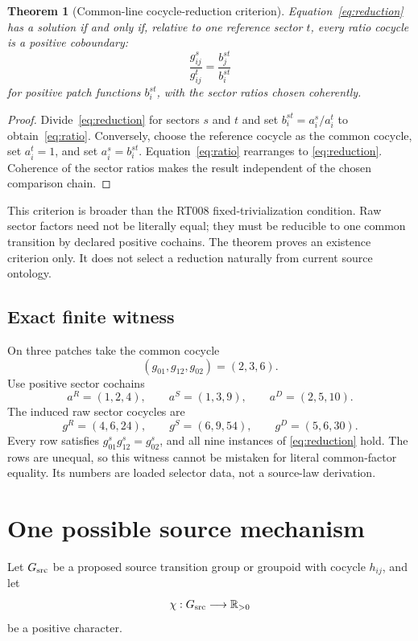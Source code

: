 \documentclass[11pt]{article}
\newtheorem{theorem}{Theorem}
\newcommand{\RR}{\mathbb R}
\begin{document}
\begin{theorem}[Common-line cocycle-reduction criterion]
Equation~\eqref{eq:reduction} has a solution if and only if, relative to one
reference sector $t$, every ratio cocycle is a positive coboundary:
\begin{equation}\label{eq:ratio}
 \frac{g^s_{ij}}{g^t_{ij}}
 =\frac{b^{st}_j}{b^{st}_i}
\end{equation}
for positive patch functions $b^{st}_i$, with the sector ratios chosen
coherently.
\end{theorem}

\begin{proof}
Divide~\eqref{eq:reduction} for sectors $s$ and $t$ and set
$b^{st}_i=a^s_i/a^t_i$ to obtain~\eqref{eq:ratio}.  Conversely, choose the
reference cocycle as the common cocycle, set $a^t_i=1$, and set
$a^s_i=b^{st}_i$.  Equation~\eqref{eq:ratio} rearranges to
\eqref{eq:reduction}.  Coherence of the sector ratios makes the result
independent of the chosen comparison chain.
\end{proof}

This criterion is broader than the RT008 fixed-trivialization condition.
Raw sector factors need not be literally equal; they must be reducible to one
common transition by declared positive cochains.  The theorem proves an
existence criterion only.  It does not select a reduction naturally from
current source ontology.

\subsection{Exact finite witness}

On three patches take the common cocycle
\[
 (g_{01},g_{12},g_{02})=(2,3,6).
\]
Use positive sector cochains
\[
 a^R=(1,2,4),\qquad
 a^S=(1,3,9),\qquad
 a^D=(2,5,10).
\]
The induced raw sector cocycles are
\[
 g^R=(4,6,24),\qquad
 g^S=(6,9,54),\qquad
 g^D=(5,6,30).
\]
Every row satisfies $g^s_{01}g^s_{12}=g^s_{02}$, and all nine instances of
\eqref{eq:reduction} hold.  The rows are unequal, so this witness cannot be
mistaken for literal common-factor equality.  Its numbers are loaded selector
data, not a source-law derivation.

\section{One possible source mechanism}

Let $G_{\rm src}$ be a proposed source transition group or groupoid with
cocycle $h_{ij}$, and let
\[
 \chi:G_{\rm src}\longrightarrow\RR_{>0}
\]
be a positive character.
\end{document}
